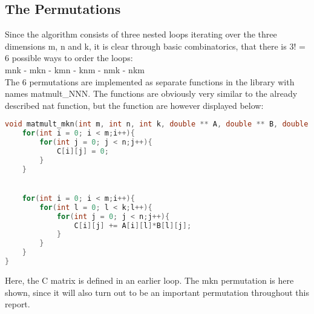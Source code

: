 \subsection{The Permutations}

Since the algorithm consists of three nested loops iterating over the three dimensions m, n and k, it is clear through basic combinatorics, that there is 3! = 6 possible ways to order the loops:\\
mnk - mkn - kmn - knm - nmk - nkm \\
The 6 permutations are implemented as separate functions in the library with names matmult\_NNN. The functions are obviously very similar to the already described nat function, but the function are however displayed below:

\begin{lstlisting}[language=C++, caption=lib]
void matmult_mkn(int m, int n, int k, double ** A, double ** B, double ** C){
	for(int i = 0; i < m;i++){
		for(int j = 0; j < n;j++){
			C[i][j] = 0;		
		}
	}


	for(int i = 0; i < m;i++){
		for(int l = 0; l < k;l++){
			for(int j = 0; j < n;j++){
				C[i][j] += A[i][l]*B[l][j];
			}
		}
	}
}
\end{lstlisting}

Here, the C matrix is defined in an earlier loop. The mkn permutation is here shown, since it will also turn out to be an important permutation throughout this report.